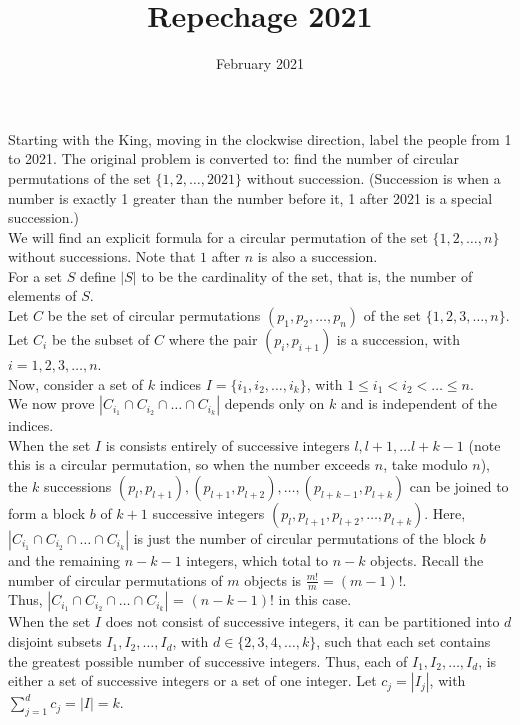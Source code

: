 \documentclass{article}
\title{Repechage 2021}
\date{February 2021}
\begin{document}
Starting with the King, moving in the clockwise direction, label the people from 1 to 2021. The original problem is converted to: find the number of circular permutations of the set $\{1,2, \dots , 2021\}$ without succession. (Succession is when a number is exactly 1 greater than the number before it, 1 after 2021 is a special succession.) \\

We will find an explicit formula for a circular permutation of the set $\{1,2,\dots , n\}$ without successions. Note that $1$ after $n$ is also a succession. \\

For a set $S$ define $|S|$ to be the cardinality of the set, that is, the number of elements of $S$. \\

Let $C$ be the set of circular permutations $(p_1,p_2,\dots , p_n)$ of the set $\{1,2,3,\dots , n\}$. \\
Let $C_i$ be the subset of $C$ where the pair $(p_i, p_{i + 1})$ is a succession, with $i = 1,2,3,\dots , n$. \\

Now, consider a set of $k$ indices $I = \{i_1,i_2, \dots , i_k \}$, with $1 \le i_1 < i_2 < \dots \le n$. \\
We now prove $\left| C_{i_1}\cap C_{i_2} \cap \dots \cap C_{i_k} \right|$ depends only on $k$ and is independent of the indices. \\

When the set $I$ is consists entirely of successive integers $l,l+1,\dots l + k - 1$  (note this is a circular permutation, so when the number exceeds $n$, take modulo $n$), the $k$ successions $(p_l,p_{l+1}), (p_{l+1},p_{l+2}), \dots, (p_{l+k - 1},p_{l+k})$ can be joined to form a block $b$ of $k + 1$ successive integers $(p_l,p_{l+1},p_{l+2}, \dots ,p_{l+k})$. Here, $\left| C_{i_1}\cap C_{i_2} \cap \dots \cap C_{i_k} \right|$ is just the number of circular permutations of the block $b$ and the remaining $n-k-1$ integers, which total to $n-k$ objects. Recall the number of circular permutations of $m$ objects is $\frac{m!}{m} = (m-1)!$. \\
Thus, $\left| C_{i_1}\cap C_{i_2} \cap \dots \cap C_{i_k} \right|$ =  $(n-k-1)!$ in this case. \\

When the set $I$ does not consist of successive integers, it can be partitioned into $d$ disjoint subsets $I_1,I_2,\dots , I_d$, with $d\in \{ 2,3,4,\dots,k \}$, such that each set contains the greatest possible number of successive integers. Thus, each of $I_1,I_2,\dots , I_d$, is either a set of successive integers or a set of one integer. Let $c_j = |I_j|$, with $\sum_{j=1}^d c_j = |I| = k$. \\
\end{document}
